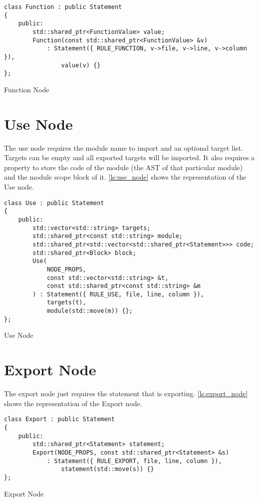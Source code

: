 \begin{listing}[H]
\begin{verbatim}
class Function : public Statement
{
    public:
        std::shared_ptr<FunctionValue> value;
        Function(const std::shared_ptr<FunctionValue> &v)
            : Statement({ RULE_FUNCTION, v->file, v->line, v->column }),
                value(v) {}
};
\end{verbatim}
\caption{Function Node}
\label{ls:function_node}
\end{listing}

\section{Use Node}

The use node requires the module name to import and an optional target list. Targets can be empty and all exported targets
will be imported. It also requires a property to store the code of the module (the AST of that particular module) and
the module scope block of it.
\autoref{ls:use_node} shows the representation of the Use node.

\begin{listing}[H]
\begin{verbatim}
class Use : public Statement
{
    public:
        std::vector<std::string> targets;
        std::shared_ptr<const std::string> module;
        std::shared_ptr<std::vector<std::shared_ptr<Statement>>> code;
        std::shared_ptr<Block> block;
        Use(
            NODE_PROPS,
            const std::vector<std::string> &t,
            const std::shared_ptr<const std::string> &m
        ) : Statement({ RULE_USE, file, line, column }),
            targets(t),
            module(std::move(m)) {};
};
\end{verbatim}
\caption{Use Node}
\label{ls:use_node}
\end{listing}

\section{Export Node}

The export node just requires the statement that is exporting.
\autoref{ls:export_node} shows the representation of the Export node.

\begin{listing}[H]
\begin{verbatim}
class Export : public Statement
{
    public:
        std::shared_ptr<Statement> statement;
        Export(NODE_PROPS, const std::shared_ptr<Statement> &s)
            : Statement({ RULE_EXPORT, file, line, column }),
                statement(std::move(s)) {}
};
\end{verbatim}
\caption{Export Node}
\label{ls:export_node}
\end{listing}

